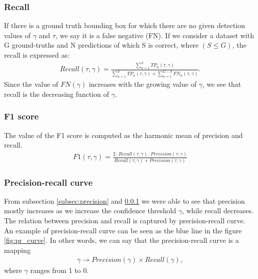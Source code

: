\subsubsection{Recall}
\label{subsec:recall}
If there is a ground truth bounding box for which there are no given detection values of $\gamma$ and $\tau$, we say it is a false negative (FN). If we consider a dataset with G ground-truths and N predictions of which S is correct, where $(S \leq G)$, the recall is expressed as:
\begin{align}
    Recall(\tau, \gamma) = \frac{\sum_{n=1}^S TP_n(\tau, \gamma)}{\sum_{n=1}^S TP_n(\tau, \gamma) + \sum_{n=1}^{G-S} FN_n(\tau, \gamma)}.
\end{align}
Since the value of $FN(\gamma)$ increases with the growing value of $\gamma$, we see that recall is the decreasing function of $\gamma$.
\subsubsection{F1 score}
The value of the F1 score is computed as the harmonic mean of precision and recall.
\begin{align}
    F1(\tau, \gamma) = \frac{2 \cdot Recall(\tau,\gamma) \cdot Precision(\tau, \gamma)}{Recall(\tau,\gamma) + Precision(\tau, \gamma)}
\end{align}

\subsubsection{Precision-recall curve}
From subsection \ref{subsec:precision} and \ref{subsec:recall} we were able to see that precision mostly increases as we increase the confidence threshold $\gamma$, while recall decreases. The relation between precision and recall is captured by precision-recall curve. An example of precision-recall curve can be seen as the blue line in the figure \ref{fig:pr_curve}. In other words, we can say that the precision-recall curve is a mapping
\begin{align}
    \gamma \rightarrow Precision(\gamma) \times  Recall(\gamma),
    \label{eq:pr_curve}
\end{align}
where $\gamma$ ranges from 1 to 0.

